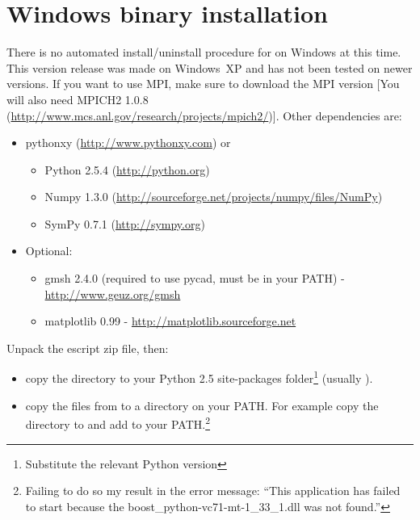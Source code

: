 %
%
%

\section{Windows binary installation}
\label{sec:binwin}

There is no automated install/uninstall procedure for \esfinley on Windows at this time.
This version release was made on Windows~XP and has not been tested on newer versions.
If you want to use MPI, make sure to download the MPI version [You will also need 
MPICH2 1.0.8 (\url{http://www.mcs.anl.gov/research/projects/mpich2/})].
Other dependencies are:
\begin{itemize}
 \item pythonxy (\url{http://www.pythonxy.com}) or 
  \begin{itemize}
	\item Python 2.5.4 (\url{http://python.org})
	\item Numpy 1.3.0 (\url{http://sourceforge.net/projects/numpy/files/NumPy})
	\item SymPy 0.7.1 (\url{http://sympy.org})
  \end{itemize}
  \item Optional:
  \begin{itemize}
      \item gmsh 2.4.0 (required to use pycad, must be in your PATH) - \url{http://www.geuz.org/gmsh}
    \item matplotlib 0.99 - \url{http://matplotlib.sourceforge.net}
  \end{itemize}
\end{itemize}


Unpack the escript zip file, then:
\begin{itemize}
\item 
 copy the  directory to your Python 2.5 site-packages folder\footnote{Substitute the relevant
 Python version}
 (usually ).
\item 
 copy the  files from  to a directory on your PATH. For example copy the directory to  and add   to your PATH.\footnote{Failing to do so my result in the error message:
``This application has failed to start because the boost_python-vc71-mt-1_33_1.dll was not found.''
}
\end{itemize}

